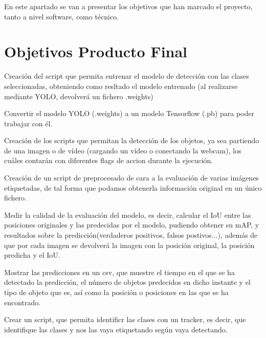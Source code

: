 
En este apartado se van a presentar los objetivos que han marcado el proyecto, tanto a nivel software, como técnico.

\section{Objetivos Producto Final}
\begin{list}{\textbullet}{ %
    \addtolength{\itemsep}{-2mm} %
    \setlength{\itemindent}{2mm}}

    \item Creación del script que permita entrenar el modelo de detección con las clases seleccionadas, obteniendo como resltado el modelo entrenado (al realizarse mediante YOLO, devolverá un fichero .weights)
    \item Convertir el modelo YOLO (.weights) a un modelo Tensorflow (.pb) para poder trabajar con él.
    \item Creación de los scripts que permitan la detección de los objetos, ya sea partiendo de una imagen o de vídeo (cargando un vídeo o conectando la webcam), los cuáles contarán con diferentes flags de accion durante la ejecución.
    \item Creación de un script de preprocesado de cara a la evaluación de varias imágenes etiquetadas, de tal forma que podamos obtenerla información original en un único fichero.
    \item Medir la calidad de la evaluación del modelo, es decir, calcular el IoU entre las posiciones originales y las predecidas por el modelo, pudiendo obtener su mAP, y resultados sobre la predicción(verdaderos positivos, falsos postivos...), además de que por cada imagen se devolverá la imagen con la posición original, la posición predicha y el IoU.
    \item Mostrar las predicciones en un csv, que muestre el tiempo en el que se ha detectado la predicción, el número de objetos predecidos en dicho instante y el tipo de objeto que es, así como la posición o posiciones en las que se ha encontrado.
    \item Crear un script, que permita identificr las clases con un tracker, es decir, que identifique las clases y nos las vaya etiquetando según vaya detectando.
\end{list}

